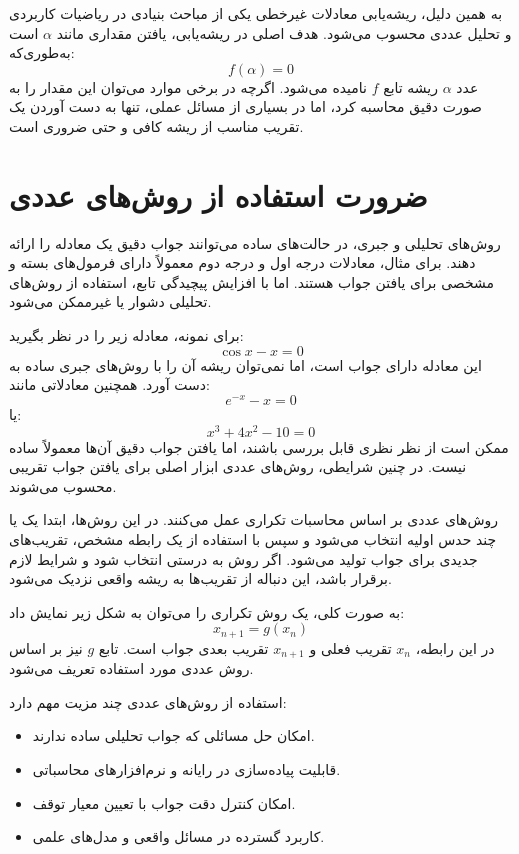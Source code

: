 به همین دلیل، ریشه‌یابی معادلات غیرخطی یکی از مباحث بنیادی در ریاضیات کاربردی و تحلیل عددی محسوب می‌شود. هدف اصلی در ریشه‌یابی، یافتن مقداری مانند $\alpha$ است به‌طوری‌که:
\begin{equation}
f(\alpha)=0
\label{eq:falpha}
\end{equation}
عدد $\alpha$ ریشه تابع $f$ نامیده می‌شود. اگرچه در برخی موارد می‌توان این مقدار را به صورت دقیق محاسبه کرد، اما در بسیاری از مسائل عملی، تنها به دست آوردن یک تقریب مناسب از ریشه کافی و حتی ضروری است.

\section{ضرورت استفاده از روش‌های عددی}
\label{sec:num}

روش‌های تحلیلی و جبری، در حالت‌های ساده می‌توانند جواب دقیق یک معادله را ارائه دهند. برای مثال، معادلات درجه اول و درجه دوم معمولاً دارای فرمول‌های بسته و مشخصی برای یافتن جواب هستند. اما با افزایش پیچیدگی تابع، استفاده از روش‌های تحلیلی دشوار یا غیرممکن می‌شود.

برای نمونه، معادله زیر را در نظر بگیرید:
\begin{equation}
\cos x - x = 0
\label{eq:cosx}
\end{equation}
این معادله دارای جواب است، اما نمی‌توان ریشه آن را با روش‌های جبری ساده به دست آورد. همچنین معادلاتی مانند:
\begin{equation}
e^{-x}-x=0
\label{eq:expx}
\end{equation}
یا:
\begin{equation}
x^3+4x^2-10=0
\label{eq:cubic}
\end{equation}
ممکن است از نظر نظری قابل بررسی باشند، اما یافتن جواب دقیق آن‌ها معمولاً ساده نیست. در چنین شرایطی، روش‌های عددی ابزار اصلی برای یافتن جواب تقریبی محسوب می‌شوند.

روش‌های عددی بر اساس محاسبات تکراری عمل می‌کنند. در این روش‌ها، ابتدا یک یا چند حدس اولیه انتخاب می‌شود و سپس با استفاده از یک رابطه مشخص، تقریب‌های جدیدی برای جواب تولید می‌شود. اگر روش به درستی انتخاب شود و شرایط لازم برقرار باشد، این دنباله از تقریب‌ها به ریشه واقعی نزدیک می‌شود.

به صورت کلی، یک روش تکراری را می‌توان به شکل زیر نمایش داد:
\begin{equation}
x_{n+1}=g(x_n)
\label{eq:iteration}
\end{equation}
در این رابطه، $x_n$ تقریب فعلی و $x_{n+1}$ تقریب بعدی جواب است. تابع $g$ نیز بر اساس روش عددی مورد استفاده تعریف می‌شود.

استفاده از روش‌های عددی چند مزیت مهم دارد:
\begin{itemize}
    \item امکان حل مسائلی که جواب تحلیلی ساده ندارند.
    \item قابلیت پیاده‌سازی در رایانه و نرم‌افزارهای محاسباتی.
    \item امکان کنترل دقت جواب با تعیین معیار توقف.
    \item کاربرد گسترده در مسائل واقعی و مدل‌های علمی.
\end{itemize}

